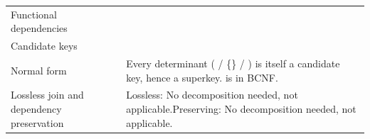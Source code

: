 \begin{xltabular}{\linewidth}{@{}KY@{}}
Functional dependencies & \begin{points}
  \item {}
  \item {}
  \item {}
\end{points} \\
Candidate keys & \begin{points}
  \item {} %
  \item {} %
  \item {} %
\end{points} \\
Normal form & Every determinant ( / \{\} / ) is itself a candidate key, hence a superkey.  is in BCNF. \\
Lossless join and dependency preservation & Lossless: No decomposition needed, not applicable.\newline Preserving: No decomposition needed, not applicable. \\
\bottomrule
\end{xltabular}

